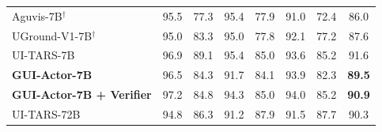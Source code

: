 \begin{table}[!t]
{\begin{tabular}{lccccccc}
Aguvis-7B$^{\dagger}$ & 95.5 & 77.3 & 95.4 & 77.9 & 91.0 & 72.4 & \cellcolor{lightblue}86.0\\
UGround-V1-7B$^{\dagger}$ & 95.0 & 83.3 & 95.0 & 77.8 & 92.1 & 77.2 & \cellcolor{lightblue}87.6 \\
UI-TARS-7B & 96.9 & 89.1 & 95.4 & 85.0 & 93.6 & 85.2 & \cellcolor{lightblue}91.6 \\
\cellcolor{lightblue}\textbf{GUI-Actor-7B} & \cellcolor{lightblue}96.5 & \cellcolor{lightblue}84.3 & \cellcolor{lightblue}91.7 & \cellcolor{lightblue}84.1 & \cellcolor{lightblue}93.9 & \cellcolor{lightblue}82.3 & \cellcolor{lightblue}\textbf{89.5} \\
\cellcolor{lightblue}\textbf{GUI-Actor-7B + Verifier} &
\cellcolor{lightblue}97.2 & \cellcolor{lightblue}84.8 & \cellcolor{lightblue}94.3 & \cellcolor{lightblue}85.0 & \cellcolor{lightblue}94.0 & \cellcolor{lightblue}85.2 & \cellcolor{lightblue}\textbf{90.9} \\
\midrule
UI-TARS-72B & 94.8 & 86.3 & 91.2 & 87.9 & 91.5 & 87.7 & \cellcolor{lightblue}90.3 \\


\bottomrule
\end{tabular}
}
\label{tab:screenspot_v2}
\end{table}
